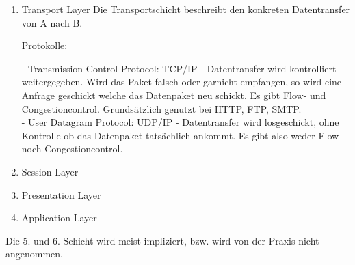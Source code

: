 \documentclass[11pt]{article}
\begin{document}
\begin{enumerate}
        \item Transport Layer
        Die Transportschicht beschreibt den konkreten Datentransfer von A nach B.

        Protokolle:
        \begin{addmargin}[1em]{1em}
            - Transmission Control Protocol: TCP/IP - Datentransfer wird kontrolliert weitergegeben. Wird das Paket falsch oder garnicht
            empfangen, so wird eine Anfrage geschickt welche das Datenpaket neu schickt.
            Es gibt Flow- und Congestioncontrol. Grundsätzlich genutzt bei HTTP, FTP, SMTP.\\
            - User Datagram Protocol: UDP/IP - Datentransfer wird losgeschickt, ohne Kontrolle ob das Datenpaket tatsächlich ankommt.
            Es gibt also weder Flow- noch Congestioncontrol.\\
        \end{addmargin}

        \item Session Layer

        \item Presentation Layer

        \item Application Layer

    \end{enumerate}

    Die 5. und 6. Schicht wird meist impliziert, bzw. wird von der Praxis nicht angenommen.
\end{document}
